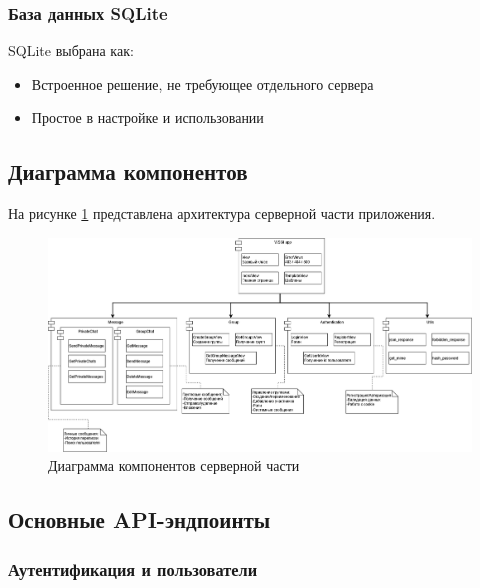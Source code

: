 \subsubsection{База данных SQLite}

SQLite выбрана как:
\begin{itemize}
	\item Встроенное решение, не требующее отдельного сервера
	\item Простое в настройке и использовании
\end{itemize}

\subsection{Диаграмма компонентов}

На рисунке \ref{fig:-components} представлена архитектура серверной части приложения.

\begin{figure}[ht]
	\centering
	\includegraphics[width=0.9\linewidth]{"images/Диаграмма компонентов"}
	\caption{Диаграмма компонентов серверной части}
	\label{fig:-components}
\end{figure}

\subsection{Основные API-эндпоинты}

\subsubsection{Аутентификация и пользователи}

